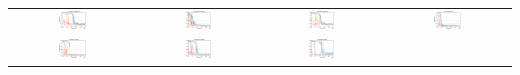 \begin{table}[]
    \centering
    \begin{tabular}{cccc}
         \hspace{-10pt}\includegraphics[width=0.23\textwidth]{figures/mixed_backflip.png}
         &
         \includegraphics[width=0.23\textwidth]{figures/mixed_cartwheel.png}
         &
         \includegraphics[width=0.23\textwidth]{figures/mixed_sideflip.png}
         &
         \includegraphics[width=0.23\textwidth]{figures/mixed_run.png}
         \\
         \hspace{-10pt}\includegraphics[width=0.23\textwidth]{figures/mixed_walk.png}
         &
         \includegraphics[width=0.23\textwidth]{figures/mixed_zombie.png}
         &
         \includegraphics[width=0.23\textwidth]{figures/mixed_jump.png}

\end{tabular}
\end{table}
